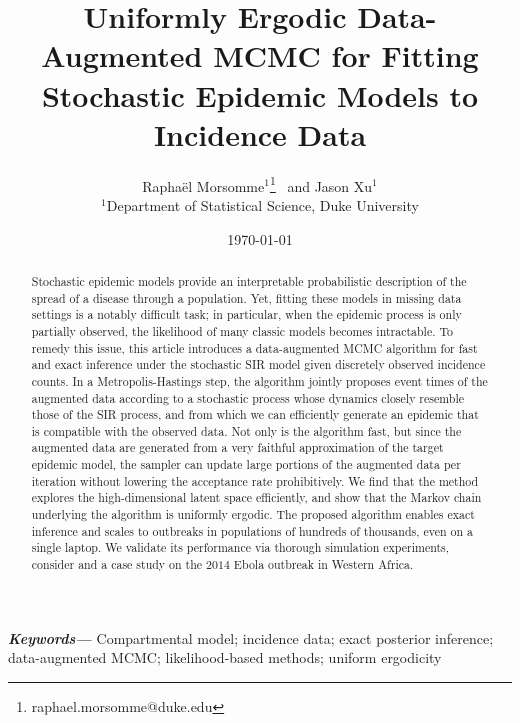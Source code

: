 \documentclass[11pt]{article}
\begin{document}
	
	\providecommand{\keywords}[1]
	{
		\small	
		\textbf{\textit{Keywords---}} #1
	}
	
	
	\title{%
		Uniformly Ergodic Data-Augmented MCMC for Fitting Stochastic Epidemic Models to Incidence Data}
	\author{Rapha\"{e}l Morsomme$^{1}$\footnote{raphael.morsomme@duke.edu} \ and Jason Xu$^{1}$ \\
		\small $^{1}$Department of Statistical Science, Duke University \\
	}
	\date{\today}	
	\maketitle
	
	\begin{abstract}
		Stochastic epidemic models provide an interpretable probabilistic description of the spread of a disease through a population. Yet, fitting these models in missing data settings is a notably difficult task; in particular, when the epidemic process is only partially observed, the likelihood of many classic models becomes intractable. To remedy this issue, this article introduces a data-augmented MCMC algorithm for fast and exact inference under the stochastic SIR model given discretely observed incidence counts. In a Metropolis-Hastings step, the algorithm jointly proposes event times of the augmented data according to a stochastic process whose dynamics closely resemble those of the SIR process, and from which we can efficiently generate an epidemic that is compatible with the observed data. Not only is the algorithm fast, but since the augmented data are generated from a very faithful approximation of the target epidemic model, the sampler can update large portions of the augmented data per iteration without lowering the acceptance rate prohibitively. We find that the method explores the high-dimensional latent space efficiently, and show that the Markov chain underlying the algorithm is uniformly ergodic. %
		The proposed algorithm enables exact inference and scales to outbreaks in populations of hundreds of thousands, even on a single laptop. We validate its performance via thorough simulation experiments, consider and a case study on the $2014$ Ebola outbreak in Western Africa. %
	\end{abstract}
	\keywords{Compartmental model; incidence data; exact posterior inference; data-augmented MCMC; likelihood-based methods; uniform ergodicity}
	
\end{document}
